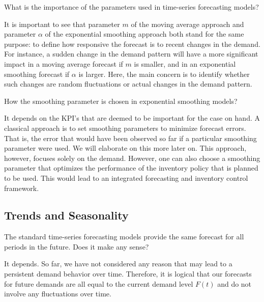 \begin{question}
What is the importance of the parameters used in time-series forecasting models?

\end{question}

  \begin{solution}
It is important to see that parameter $m$ of the moving average approach and parameter $\alpha$ of the exponential smoothing approach both stand for the same purpose: to define how responsive the forecast is to recent changes in the demand. For instance, a sudden change in the demand pattern will have a more significant impact in a moving average forecast if $m$ is smaller, and in an exponential smoothing forecast if $\alpha$ is larger. Here, the main concern is to identify whether such changes are random fluctuations or actual changes in the demand pattern. 
    
      \end{solution}


\begin{question}
How the smoothing parameter is chosen in exponential smoothing models?

\end{question}

  \begin{solution}
	It depends on the KPI's that are deemed to be important for the case on hand. A classical approach is to set smoothing parameters to minimize forecast errors. That is, the error that would have been observed so far if a particular smoothing parameter were used. 	We will elaborate on this more later on. This approach, however, focuses solely on the demand. However, one can also choose a smoothing parameter that optimizes the performance of the inventory policy that is planned to be used. This would lead to an integrated forecasting and inventory control framework.
	
  \end{solution}

\subsection{Trends and Seasonality}

\begin{question}
The standard time-series forecasting models provide the same forecast for all periods in the future. Does it make any sense? 
\end{question}

  \begin{solution}
    It depends. So far, we have not considered any reason that may lead to a persistent demand behavior over time. Therefore, it is logical that our forecasts for future demands are all equal to the current demand level $F(t)$ and do not involve any fluctuations over time.     
      \end{solution}


